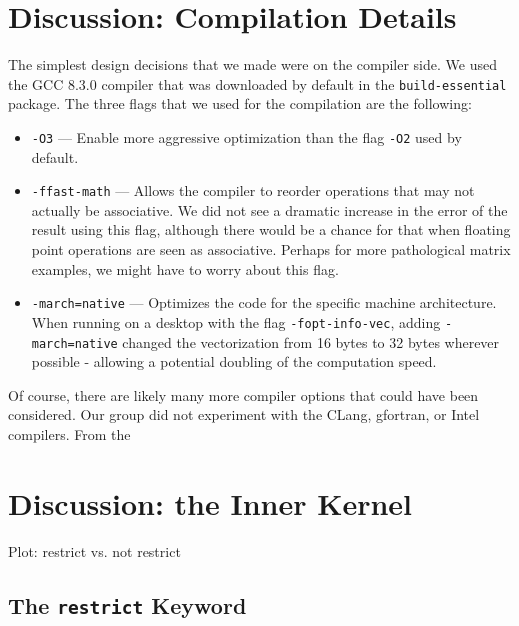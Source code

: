 \documentclass{article}
\begin{document}
\section{Discussion: Compilation Details}
The simplest design decisions that we made were on the compiler side. We used the GCC 8.3.0 compiler that was downloaded by default in the \texttt{build-essential} package. The three flags that we used for the compilation are the following:
\begin{itemize}
	\item \texttt{-O3} --- Enable more aggressive optimization than the flag \texttt{-O2} used by default. 
	\item \texttt{-ffast-math} --- Allows the compiler to reorder operations that may not actually be associative. We did not see a dramatic increase in the error of the result using this flag, although there would be a chance for that when floating point operations are seen as associative. Perhaps for more pathological matrix examples, we might have to worry about this flag.
	\item \texttt{-march=native} --- Optimizes the code for the specific machine architecture. When running on a desktop with the flag \texttt{-fopt-info-vec}, adding \texttt{-march=native} changed the vectorization from 16 bytes to 32 bytes wherever possible - allowing a potential doubling of the computation speed.
\end{itemize}

Of course, there are likely many more compiler options that could have been considered. Our group did not experiment with the CLang, gfortran, or Intel compilers. From the 


\section{Discussion: the Inner Kernel}
Plot: restrict vs. not restrict




\subsection{The \texttt{restrict} Keyword}
\end{document}
